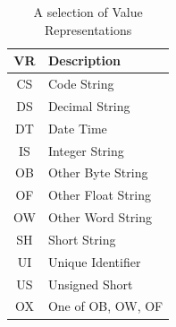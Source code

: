 \begin{table}[ht]
   \centering
   \caption{A selection of Value Representations \label{tbl:dicom:vr}}
   \smallskip
   \begin{tabular}{|cl|}
      \hline
      VR & Description\\
      \hline
      CS & Code String \\ 
      DS & Decimal String \\ 
      DT & Date Time \\ 
      IS & Integer String \\ 
      OB & Other Byte String \\ 
      OF & Other Float String \\ 
      OW & Other Word String \\ 
      SH & Short String \\
      UI & Unique Identifier \\ 
      US & Unsigned Short \\ 
      OX & One of OB, OW, OF\\
      \hline
   \end{tabular}
\end{table}

